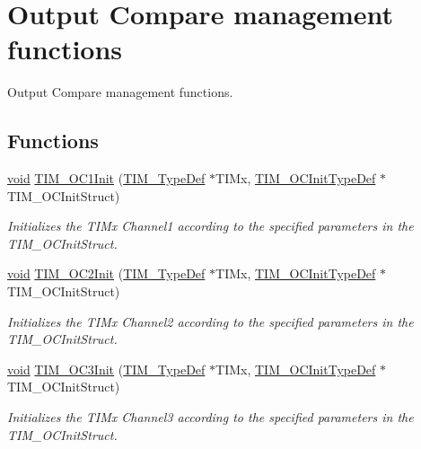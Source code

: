 \hypertarget{group___t_i_m___group2}{\section{Output Compare management functions}
\label{group___t_i_m___group2}
}


Output Compare management functions.  


\subsection*{Functions}
\begin{DoxyCompactItemize}
\item 
\hyperlink{group___n_a_m_e_ga18028b8badbf1ea7e704ccac3c488e82}{void} \hyperlink{group___t_i_m___group2_gafcdb6ff00158862aef7fed5e7a554a3e}{T\-I\-M\-\_\-\-O\-C1\-Init} (\hyperlink{struct_t_i_m___type_def}{T\-I\-M\-\_\-\-Type\-Def} $\ast$T\-I\-Mx, \hyperlink{struct_t_i_m___o_c_init_type_def}{T\-I\-M\-\_\-\-O\-C\-Init\-Type\-Def} $\ast$T\-I\-M\-\_\-\-O\-C\-Init\-Struct)
\begin{DoxyCompactList}\small\item\em Initializes the T\-I\-Mx Channel1 according to the specified parameters in the T\-I\-M\-\_\-\-O\-C\-Init\-Struct. \end{DoxyCompactList}\item 
\hyperlink{group___n_a_m_e_ga18028b8badbf1ea7e704ccac3c488e82}{void} \hyperlink{group___t_i_m___group2_ga2017455121d910d6ff63ac6f219842c5}{T\-I\-M\-\_\-\-O\-C2\-Init} (\hyperlink{struct_t_i_m___type_def}{T\-I\-M\-\_\-\-Type\-Def} $\ast$T\-I\-Mx, \hyperlink{struct_t_i_m___o_c_init_type_def}{T\-I\-M\-\_\-\-O\-C\-Init\-Type\-Def} $\ast$T\-I\-M\-\_\-\-O\-C\-Init\-Struct)
\begin{DoxyCompactList}\small\item\em Initializes the T\-I\-Mx Channel2 according to the specified parameters in the T\-I\-M\-\_\-\-O\-C\-Init\-Struct. \end{DoxyCompactList}\item 
\hyperlink{group___n_a_m_e_ga18028b8badbf1ea7e704ccac3c488e82}{void} \hyperlink{group___t_i_m___group2_ga90d4a358d4e6d4c5ed17dc1d6beb5f30}{T\-I\-M\-\_\-\-O\-C3\-Init} (\hyperlink{struct_t_i_m___type_def}{T\-I\-M\-\_\-\-Type\-Def} $\ast$T\-I\-Mx, \hyperlink{struct_t_i_m___o_c_init_type_def}{T\-I\-M\-\_\-\-O\-C\-Init\-Type\-Def} $\ast$T\-I\-M\-\_\-\-O\-C\-Init\-Struct)
\begin{DoxyCompactList}\small\item\em Initializes the T\-I\-Mx Channel3 according to the specified parameters in the T\-I\-M\-\_\-\-O\-C\-Init\-Struct. \end{DoxyCompactList}\item 

\end{DoxyCompactItemize}
